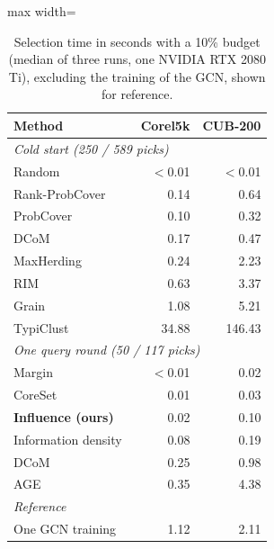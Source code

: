 \begin{table}[t]
\centering
\caption{Selection time in seconds with a 10\% budget (median of three runs, one NVIDIA RTX 2080 Ti), excluding the training of the GCN, shown for reference.}
\label{tab:cost}
\footnotesize
\begin{adjustbox}{max width=\columnwidth}
\begin{tabular}{lrr}
\toprule
Method & Corel5k & CUB-200 \\
\midrule
\multicolumn{3}{l}{\textit{Cold start (250 / 589 picks)}} \\
\quad Random & $<$0.01 & $<$0.01 \\
\quad Rank-ProbCover & 0.14 & 0.64 \\
\quad ProbCover~\cite{yehuda2022active} & 0.10 & 0.32 \\
\quad DCoM~\cite{mishal2024dcom} & 0.17 & 0.47 \\
\quad MaxHerding~\cite{bae2024generalized} & 0.24 & 2.23 \\
\quad RIM~\cite{zhang2021rim} & 0.63 & 3.37 \\
\quad Grain~\cite{zhang2021grain} & 1.08 & 5.21 \\
\quad TypiClust~\cite{hacohen2022active} & 34.88 & 146.43 \\
\multicolumn{3}{l}{\textit{One query round (50 / 117 picks)}} \\
\quad Margin~\cite{scheffer2001active} & $<$0.01 & 0.02 \\
\quad CoreSet~\cite{sener2017active} & 0.01 & 0.03 \\
\quad \textbf{Influence (ours)} & 0.02 & 0.10 \\
\quad Information density~\cite{settles2008analysis} & 0.08 & 0.19 \\
\quad DCoM~\cite{mishal2024dcom} & 0.25 & 0.98 \\
\quad AGE~\cite{cai2017active} & 0.35 & 4.38 \\
\multicolumn{3}{l}{\textit{Reference}} \\
\quad One GCN training & 1.12 & 2.11 \\
\bottomrule
\end{tabular}
\end{adjustbox}
\end{table}
